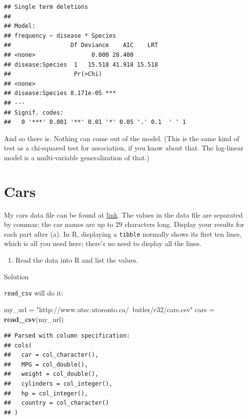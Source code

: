 \documentclass[]{tufte-book}
\newenvironment{Shaded}{}{}
\newcommand{\KeywordTok}[1]{\textcolor[rgb]{0.00,0.44,0.13}{\textbf{#1}}}
\newcommand{\NormalTok}[1]{#1}
\newcommand{\StringTok}[1]{\textcolor[rgb]{0.25,0.44,0.63}{#1}}
\providecommand{\tightlist}{%
  \setlength{\itemsep}{0pt}\setlength{\parskip}{0pt}}
\theoremstyle{definition}
\theoremstyle{definition}
\theoremstyle{definition}
\theoremstyle{remark}
\begin{document}
\begin{verbatim}
## Single term deletions
## 
## Model:
## frequency ~ disease * Species
##                 Df Deviance    AIC    LRT
## <none>                0.000 28.400       
## disease:Species  1   15.518 41.918 15.518
##                  Pr(>Chi)    
## <none>                       
## disease:Species 8.171e-05 ***
## ---
## Signif. codes:  
##   0 '***' 0.001 '**' 0.01 '*' 0.05 '.' 0.1  ' ' 1
\end{verbatim}

And so there is. Nothing can come out of the model. (This is the same
kind of test as a chi-squared test for association, if you know about
that. The log-linear model is a multi-variable generalization of that.)

\hypertarget{cars}{%
\section{Cars}\label{cars}}

My cars data file can be found at
\href{http://www.utsc.utoronto.ca/~butler/c32/cars.csv}{link}. The
values in the data file are separated by commas; the car names are up to
29 characters long. Display your results for each part after (a). In R,
displaying a \texttt{tibble} normally shows its first ten lines, which
is all you need here; there's no need to display all the lines.

\begin{enumerate}
\def\labelenumi{(\alph{enumi})}
\tightlist
\item
  Read the data into R and list the values.
\end{enumerate}

Solution

\texttt{read\_csv} will do it:

\begin{Shaded}
\begin{Highlighting}[]
\NormalTok{my_url =}\StringTok{ "http://www.utsc.utoronto.ca/~butler/c32/cars.csv"}
\NormalTok{cars =}\StringTok{ }\KeywordTok{read_csv}\NormalTok{(my_url)}
\end{Highlighting}
\end{Shaded}

\begin{verbatim}
## Parsed with column specification:
## cols(
##   car = col_character(),
##   MPG = col_double(),
##   weight = col_double(),
##   cylinders = col_integer(),
##   hp = col_integer(),
##   country = col_character()
## )
\end{verbatim}
\end{document}
